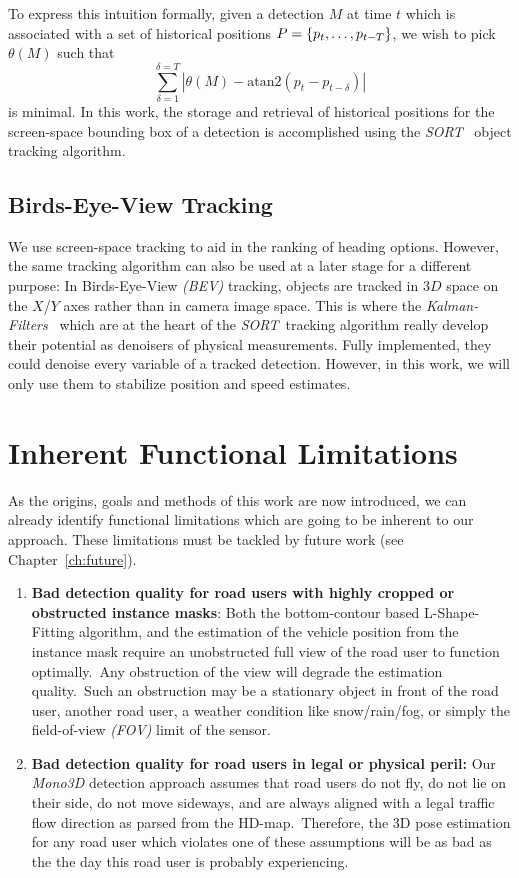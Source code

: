 To express this intuition formally, given a detection $M$ at time $t$ which is associated with a set of historical positions $P=\{p_{t},\mathellipsis,p_{t-T}\}$, we wish to pick $\theta(M)$ such that \[\sum_{\delta=1}^{\delta=T} |\theta(M) - \text{atan2}(p_t - p_{t-\delta})|\] is minimal.
In this work, the storage and retrieval of historical positions for the screen-space bounding box of a detection is accomplished using the \textit{SORT}~\cite{bewley2016simple} object tracking algorithm.

\subsection{Birds-Eye-View Tracking}
\label{subsec:bevtracking}

We use screen-space tracking to aid in the ranking of heading options.
However, the same tracking algorithm can also be used at a later stage for a different purpose:
In Birds-Eye-View \textit{(BEV)} tracking, objects are tracked in $3D$ space on the $X$/$Y$ axes rather than in camera image space.
This is where the \textit{Kalman-Filters}~\cite{welch1995kalman} which are at the heart of the \textit{SORT}~tracking algorithm really develop their potential as denoisers of physical measurements.
Fully implemented, they could denoise every variable of a tracked detection.
However, in this work, we will only use them to stabilize position and speed estimates.

\section{Inherent Functional Limitations}
\label{sec:limits}

As the origins, goals and methods of this work are now introduced, we can already identify functional limitations which are going to be inherent to our approach.
These limitations must be tackled by future work (see Chapter~\ref{ch:future}).

\begin{enumerate}
    \item \textbf{Bad detection quality for road users with highly cropped or obstructed instance masks}: Both the bottom-contour based L-Shape-Fitting algorithm, and the estimation of the vehicle position from the instance mask require an unobstructed full view of the road user to function optimally.\ Any obstruction of the view will degrade the estimation quality.\ Such an obstruction may be a stationary object in front of the road user, another road user, a weather condition like snow/rain/fog, or simply the field-of-view \textit{(FOV)} limit of the sensor.
    \item \textbf{Bad detection quality for road users in legal or physical peril:} Our \textit{Mono3D} detection approach assumes that road users do not fly, do not lie on their side, do not move sideways, and are always aligned with a legal traffic flow direction as parsed from the HD-map.\ Therefore, the 3D pose estimation for any road user which violates one of these assumptions will be as bad as the the day this road user is probably experiencing.
\end{enumerate}

